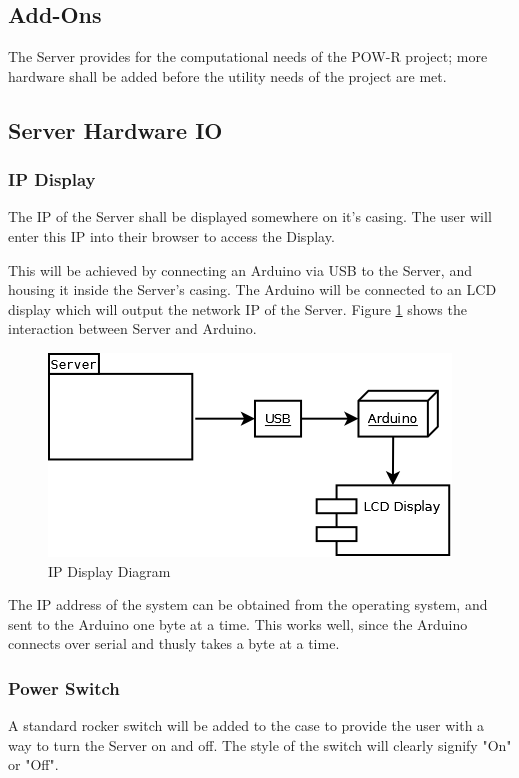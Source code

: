 
\subsection{Add-Ons}
The Server provides for the computational needs of the POW-R project; 
more hardware shall be added before the utility needs of the project are met.

\subsection{Server Hardware IO}

\subsubsection{IP Display}
The IP of the Server shall be displayed somewhere on it's casing. 
The user will enter this IP into their browser to access the Display.

This will be achieved by connecting an Arduino via USB to the Server, and housing it inside the Server's casing. 
The Arduino will be connected to an LCD display which will output the network IP of the Server. 
Figure \ref{ArduinoLCD} shows the interaction between Server and Arduino.

\begin{figure}
\centering
\includegraphics[scale=0.5]{Hardware/images/ArduinoLCD.png}
\caption{IP Display Diagram}
\label{ArduinoLCD}
\end{figure}

The IP address of the system can be obtained from the operating system, and sent to the Arduino one byte at a time. 
This works well, since the Arduino connects over serial and thusly takes a byte at a time.

\subsubsection{Power Switch}
A standard rocker switch will be added to the case to provide the user with a way to turn the Server on and off. 
The style of the switch will clearly signify "On" or "Off".


